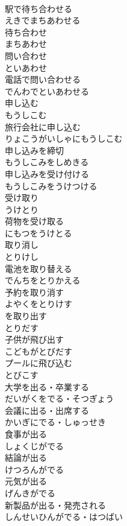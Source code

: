 \documentclass[8pt]{extreport}
\begin{document}
\begin{CJK}{UTF8}{min}
\\	駅で待ち合わせる	
\\	えきでまちあわせる
\\	待ち合わせ	
\\	まちあわせ
\\	問い合わせ	
\\	といあわせ
\\	電話で問い合わせる	
\\	でんわでといあわせる
\\	申し込む	
\\	もうしこむ
\\	旅行会社に申し込む	
\\	りょこうがいしゃにもうしこむ
\\	申し込みを締切	
\\	もうしこみをしめきる
\\	申し込みを受け付ける	
\\	もうしこみをうけつける
\\	受け取り	
\\	うけとり
\\	荷物を受け取る	
\\	にもつをうけとる
\\	取り消し	
\\	とりけし
\\	電池を取り替える	
\\	でんちをとりかえる
\\	予約を取り消す	
\\	よやくをとりけす
\\	を取り出す	
\\	とりだす
\\	子供が飛び出す	
\\	こどもがとびだす
\\	プールに飛び込む	
\\	とびこす
\\	大学を出る・卒業する	
\\	だいがくをでる・そつぎょう
\\	会議に出る・出席する	
\\	かいぎにでる・しゅっせき
\\	食事が出る	
\\	しょくじがでる
\\	結論が出る	
\\	けつろんがでる
\\	元気が出る	
\\	げんきがでる
\\	新製品が出る・発売される	
\\	しんせいひんがでる・はつばい

\end{CJK}
\end{document}
